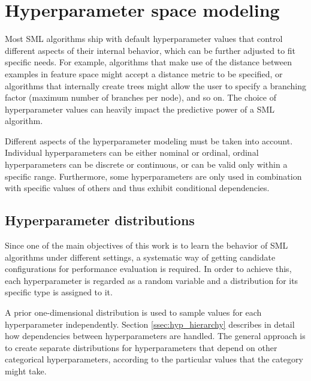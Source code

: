 \section{Hyperparameter space modeling}
	\label{sec:hyperparam_dist}
	Most SML algorithms ship with default hyperparameter values that control different aspects of their
	internal behavior, which can be further adjusted to fit specific needs. For example, algorithms
	that make use of the distance between examples in feature space might accept a distance metric
	to be specified, or algorithms that internally create trees might allow the user to specify a
	branching factor (maximum number of branches per node), and so on.  The choice of hyperparameter
	values can heavily impact the predictive power of a SML algorithm.

	Different aspects of the hyperparameter modeling must be taken into account. Individual
	hyperparameters can be either nominal or ordinal, ordinal hyperparameters can be discrete or
	continuous, or can be valid only within a specific range. Furthermore, some hyperparameters are
	only used in combination with specific values of others and thus exhibit conditional
	dependencies.

	\subsection{Hyperparameter distributions}
	\label{ssec:hyperparam_dist}
	Since one of the main objectives of this work is to learn the behavior of SML algorithms under
	different settings, a systematic way of getting candidate configurations for performance
	evaluation is required. In order to achieve this, each hyperparameter is regarded as a random
	variable and a distribution for its specific type is assigned to it.

	A prior one-dimensional distribution is used to sample values for each hyperparameter
	independently. Section \ref{ssec:hyp_hierarchy} describes in detail how dependencies between
	hyperparameters are handled. The general approach is to create separate distributions for
	hyperparameters that depend on other categorical hyperparameters, according to the particular
	values that the category might take.

